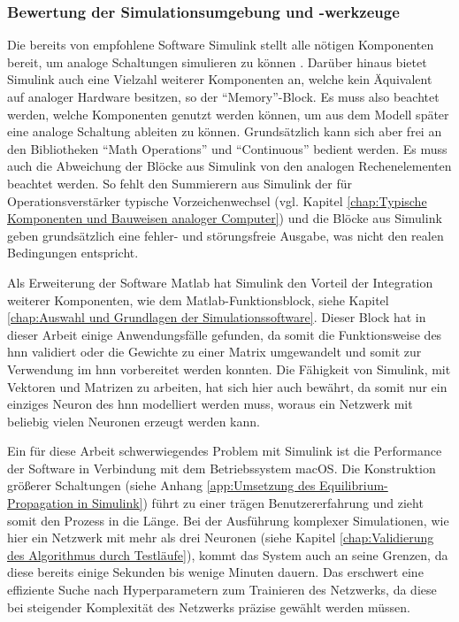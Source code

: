 \subsubsection{Bewertung der Simulationsumgebung und -werkzeuge}
\label{chap:Bewertung der Simulationsumgebung und -werkzeuge}

Die bereits von \citeauthor{Ulmann2022} empfohlene Software Simulink stellt alle nötigen Komponenten bereit, um analoge Schaltungen simulieren zu können \cite[vgl. S. 240]{Ulmann2022}. Darüber hinaus bietet Simulink auch eine Vielzahl weiterer Komponenten an, welche kein Äquivalent auf analoger Hardware besitzen, so \zb der "`Memory"'-Block. Es muss also beachtet werden, welche Komponenten genutzt werden können, um aus dem Modell später eine analoge Schaltung ableiten zu können. Grundsätzlich kann sich aber frei an den Bibliotheken "`Math Operations"' und "`Continuous"' bedient werden. Es muss auch die Abweichung der Blöcke aus Simulink von den analogen Rechenelementen beachtet werden. So fehlt \zb den Summierern aus Simulink der für Operationsverstärker typische Vorzeichenwechsel (vgl. Kapitel \ref{chap:Typische Komponenten und Bauweisen analoger Computer}) und die Blöcke aus Simulink geben grundsätzlich eine fehler- und störungsfreie Ausgabe, was nicht den realen Bedingungen entspricht.

Als Erweiterung der Software Matlab hat Simulink den Vorteil der Integration weiterer Komponenten, wie dem Matlab-Funktionsblock, siehe Kapitel \ref{chap:Auswahl und Grundlagen der Simulationssoftware}. Dieser Block hat in dieser Arbeit einige Anwendungsfälle gefunden, da somit \zb die Funktionsweise des \ac{hnn} validiert oder die Gewichte zu einer Matrix umgewandelt und somit zur Verwendung im \ac{hnn} vorbereitet werden konnten. Die Fähigkeit von Simulink, mit Vektoren und Matrizen zu arbeiten, hat sich hier auch bewährt, da somit nur ein einziges Neuron des \ac{hnn} modelliert werden muss, woraus ein Netzwerk mit beliebig vielen Neuronen erzeugt werden kann.

Ein für diese Arbeit schwerwiegendes Problem mit Simulink ist die Performance der Software in Verbindung mit dem Betriebssystem macOS. Die Konstruktion größerer Schaltungen (siehe \zb Anhang \ref{app:Umsetzung des Equilibrium-Propagation in Simulink}) führt zu einer trägen Benutzererfahrung und zieht somit den Prozess in die Länge. Bei der Ausführung komplexer Simulationen, wie hier ein Netzwerk mit mehr als drei Neuronen (siehe Kapitel \ref{chap:Validierung des Algorithmus durch Testläufe}), kommt das System auch an seine Grenzen, da diese bereits einige Sekunden bis wenige Minuten dauern. Das erschwert \zb eine effiziente Suche nach Hyperparametern zum Trainieren des Netzwerks, da diese bei steigender Komplexität des Netzwerks präzise gewählt werden müssen.
